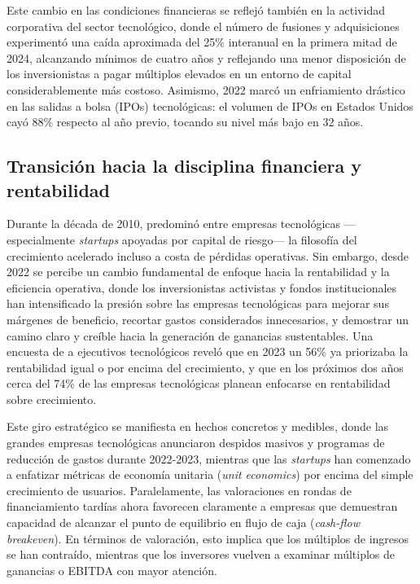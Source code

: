 Este cambio en las condiciones financieras se reflejó también en la actividad corporativa del sector tecnológico, donde el número de fusiones y adquisiciones experimentó una caída aproximada del 25\% interanual en la primera mitad de 2024, alcanzando mínimos de cuatro años y reflejando una menor disposición de los inversionistas a pagar múltiplos elevados en un entorno de capital considerablemente más costoso. Asimismo, 2022 marcó un enfriamiento drástico en las salidas a bolsa (IPOs) tecnológicas: el volumen de IPOs en Estados Unidos cayó 88\% respecto al año previo, tocando su nivel más bajo en 32 años.

\subsection{Transición hacia la disciplina financiera y rentabilidad}

Durante la década de 2010, predominó entre empresas tecnológicas ---especialmente \emph{startups} apoyadas por capital de riesgo--- la filosofía del crecimiento acelerado incluso a costa de pérdidas operativas. Sin embargo, desde 2022 se percibe un cambio fundamental de enfoque hacia la rentabilidad y la eficiencia operativa, donde los inversionistas activistas y fondos institucionales han intensificado la presión sobre las empresas tecnológicas para mejorar sus márgenes de beneficio, recortar gastos considerados innecesarios, y demostrar un camino claro y creíble hacia la generación de ganancias sustentables. Una encuesta de \cite{alixpartners2023} a ejecutivos tecnológicos reveló que en 2023 un 56\% ya priorizaba la rentabilidad igual o por encima del crecimiento, y que en los próximos dos años cerca del 74\% de las empresas tecnológicas planean enfocarse en rentabilidad sobre crecimiento.

Este giro estratégico se manifiesta en hechos concretos y medibles, donde las grandes empresas tecnológicas anunciaron despidos masivos y programas de reducción de gastos durante 2022-2023, mientras que las \emph{startups} han comenzado a enfatizar métricas de economía unitaria (\emph{unit economics}) por encima del simple crecimiento de usuarios. Paralelamente, las valoraciones en rondas de financiamiento tardías ahora favorecen claramente a empresas que demuestran capacidad de alcanzar el punto de equilibrio en flujo de caja (\emph{cash-flow breakeven}). En términos de valoración, esto implica que los múltiplos de ingresos se han contraído, mientras que los inversores vuelven a examinar múltiplos de ganancias o EBITDA con mayor atención.


